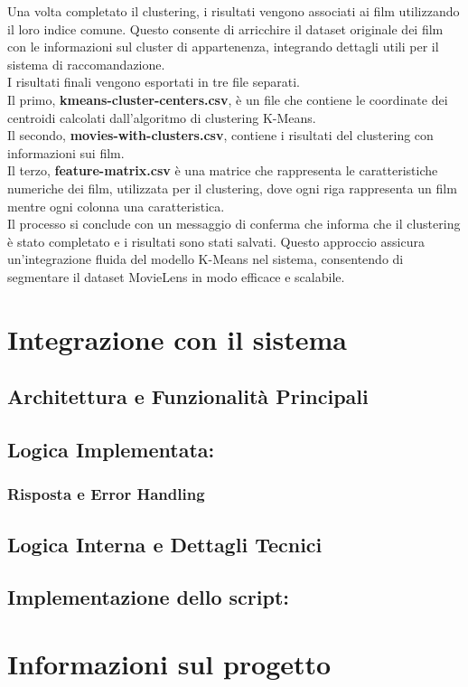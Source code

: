 \documentclass[a4paper,12pt]{article}
\begin{document}
Una volta completato il clustering, i risultati vengono associati ai film utilizzando il loro indice comune. Questo consente di arricchire il dataset originale dei film con le informazioni sul cluster di appartenenza, integrando dettagli utili per il sistema di raccomandazione.
\\I risultati finali vengono esportati in tre file separati.\\
Il primo, \textbf{kmeans-cluster-centers.csv}, è un file che contiene le coordinate dei centroidi calcolati dall'algoritmo di clustering K-Means.\\Il secondo, \textbf{movies-with-clusters.csv},  contiene i risultati del clustering con informazioni sui film.\\Il terzo, \textbf{feature-matrix.csv} è una matrice che rappresenta le caratteristiche numeriche dei film, utilizzata per il clustering, dove ogni riga rappresenta un film mentre ogni colonna una caratteristica.\\
Il processo si conclude con un messaggio di conferma che informa che il clustering è stato completato e i risultati sono stati salvati. Questo approccio assicura un'integrazione fluida del modello K-Means nel sistema, consentendo di segmentare il dataset MovieLens in modo efficace e scalabile.
\section{Integrazione con il sistema}
\subsection{Architettura e Funzionalità Principali}
\subsection{Logica Implementata: }
\subsubsection{Risposta e Error Handling}
\subsection{Logica Interna e Dettagli Tecnici}
\subsection{Implementazione dello script: }
\section{Informazioni sul progetto}
\end{document}
